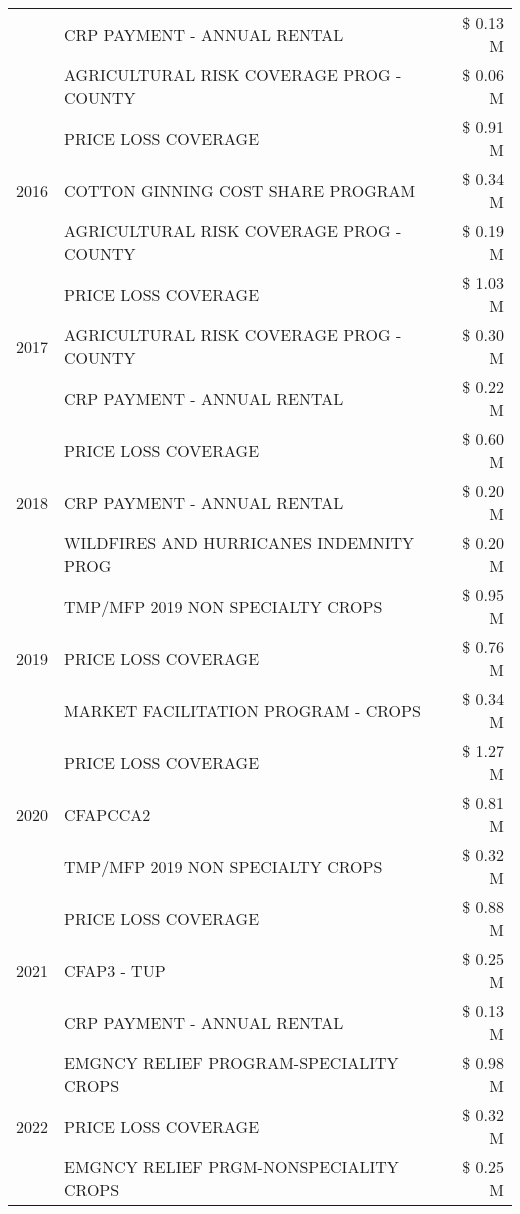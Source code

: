 \begin{tabular}{llr}
 & CRP PAYMENT - ANNUAL RENTAL & \$ 0.13 M \\
 & AGRICULTURAL RISK COVERAGE PROG - COUNTY & \$ 0.06 M \\
\cline{1-3}
\multirow[t]{3}{*}{2016} & PRICE LOSS COVERAGE & \$ 0.91 M \\
 & COTTON GINNING COST SHARE PROGRAM & \$ 0.34 M \\
 & AGRICULTURAL RISK COVERAGE PROG - COUNTY & \$ 0.19 M \\
\cline{1-3}
\multirow[t]{3}{*}{2017} & PRICE LOSS COVERAGE & \$ 1.03 M \\
 & AGRICULTURAL RISK COVERAGE PROG - COUNTY & \$ 0.30 M \\
 & CRP PAYMENT - ANNUAL RENTAL & \$ 0.22 M \\
\cline{1-3}
\multirow[t]{3}{*}{2018} & PRICE LOSS COVERAGE & \$ 0.60 M \\
 & CRP PAYMENT - ANNUAL RENTAL & \$ 0.20 M \\
 & WILDFIRES AND HURRICANES INDEMNITY PROG & \$ 0.20 M \\
\cline{1-3}
\multirow[t]{3}{*}{2019} & TMP/MFP 2019 NON SPECIALTY CROPS & \$ 0.95 M \\
 & PRICE LOSS COVERAGE & \$ 0.76 M \\
 & MARKET FACILITATION PROGRAM - CROPS & \$ 0.34 M \\
\cline{1-3}
\multirow[t]{3}{*}{2020} & PRICE LOSS COVERAGE & \$ 1.27 M \\
 & CFAPCCA2 & \$ 0.81 M \\
 & TMP/MFP 2019 NON SPECIALTY CROPS & \$ 0.32 M \\
\cline{1-3}
\multirow[t]{3}{*}{2021} & PRICE LOSS COVERAGE & \$ 0.88 M \\
 & CFAP3 - TUP & \$ 0.25 M \\
 & CRP PAYMENT - ANNUAL RENTAL & \$ 0.13 M \\
\cline{1-3}
\multirow[t]{3}{*}{2022} & EMGNCY RELIEF PROGRAM-SPECIALITY CROPS & \$ 0.98 M \\
 & PRICE LOSS COVERAGE & \$ 0.32 M \\
 & EMGNCY RELIEF PRGM-NONSPECIALITY CROPS & \$ 0.25 M \\
\cline{1-3}
\bottomrule
\end{tabular}
